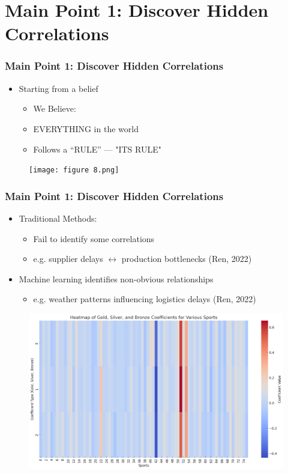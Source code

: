 \documentclass{beamer}
\begin{document}
\section{Main Point 1: Discover Hidden Correlations}
\begin{frame}
 \frametitle{Main Point 1: Discover Hidden Correlations}
\begin{minipage}{\textwidth}
{\linespread{1.3}
\begin{itemize}
    \item {\Large Starting from a belief}
    \begin{itemize}
        \item {\large We Believe:}
        \item {\large EVERYTHING in the world}
        \item {\large Follows a “RULE” --- "ITS RULE"}
    \end{itemize}
\end{itemize}
}
\begin{figure}
    \centering
    \texttt{[image: figure 8.png]}
    \label{fig:enter-label}
\end{figure}
\end{minipage}
\end{frame}




\begin{frame}
 \frametitle{Main Point 1: Discover Hidden Correlations}
\begin{minipage}{\textwidth}
{\linespread{1.5}
\begin{itemize}
    \item <1-> {\Large Traditional Methods:}
    \begin{itemize}
        \item {\large Fail to identify some correlations}
        \item {\large e.g. supplier delays $\leftrightarrow$ production bottlenecks} (Ren, 2022)
    \end{itemize}
    \item <2-> {\Large Machine learning identifies non-obvious relationships}
    \begin{itemize}
        \item {\large e.g. weather patterns influencing logistics delays} (Ren, 2022)
    \end{itemize}
\end{itemize}
}
\begin{figure}
    \centering
    \includegraphics[width=0.5\linewidth]{Heatmap.png}
    \label{fig:enter-label}
\end{figure}
\end{minipage}
\end{frame}
\end{document}
